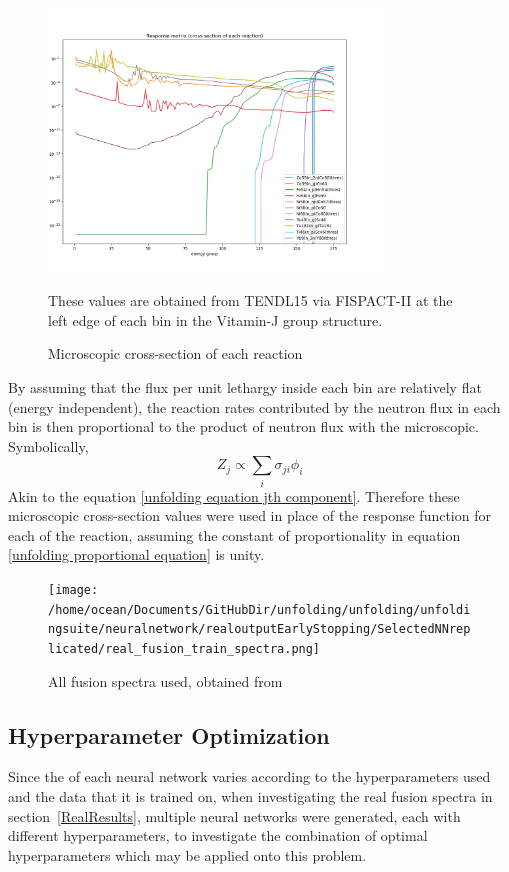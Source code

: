 \documentclass[a4paper, 12pt]{article}
\begin{document}
\begin{figure}[H]
\centering
\includegraphics[height=7cm]{PPT/response_matrix.png}
\caption{Microscopic cross-section of each reaction}\label{response_matrix}
These values are obtained from TENDL15 via FISPACT-II \cite{Fispact} at the left edge of each bin in the Vitamin-J group structure. 
\end{figure}
By assuming that the flux per unit lethargy inside each bin are relatively flat (energy independent), the reaction rates contributed by the neutron flux in each bin is then proportional to the product of neutron flux with the microscopic. Symbolically,
\begin{equation} \label{unfolding proportional equation}
    Z_j \propto \sum_i \sigma_{ji} \phi_i
\end{equation}
Akin to the equation \ref{unfolding equation jth component}. Therefore these microscopic cross-section values were used in place of the response function for each of the reaction, assuming the constant of proportionality in equation \ref{unfolding proportional equation} is unity.

\begin{figure}
\centering
\texttt{[image: /home/ocean/Documents/GitHubDir/unfolding/unfolding/unfoldingsuite/neuralnetwork/realoutputEarlyStopping/SelectedNNreplicated/real\_fusion\_train\_spectra.png]}
\caption{All fusion spectra used, obtained from \cite{IAEAUKAEACompendium}}\label{RealFusionTrain}
\end{figure}

\subsection{Hyperparameter Optimization}
Since the of each neural network varies according to the hyperparameters used and the data that it is trained on, when investigating the real fusion spectra in section~\ref{RealResults}, multiple neural networks were generated, each with different hyperparameters, to investigate the combination of optimal hyperparameters which may be applied onto this problem.
\end{document}
